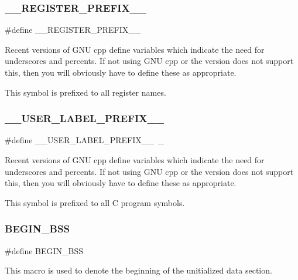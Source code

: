 \subsubsection{\texorpdfstring{\_\_REGISTER\_PREFIX\_\_}{\_\_REGISTER\_PREFIX\_\_}}
{\footnotesize\ttfamily \#define \+\_\+\+\_\+\+R\+E\+G\+I\+S\+T\+E\+R\+\_\+\+P\+R\+E\+F\+I\+X\+\_\+\+\_\+}

Recent versions of G\+NU cpp define variables which indicate the need for underscores and percents. If not using G\+NU cpp or the version does not support this, then you will obviously have to define these as appropriate.

This symbol is prefixed to all register names. \mbox{\label{group__RTEMSScoreCPUExampleASM_gaff6bf0ff0fa3b5cbd23a8ae1131c87a9}} 
\subsubsection{\texorpdfstring{\_\_USER\_LABEL\_PREFIX\_\_}{\_\_USER\_LABEL\_PREFIX\_\_}}
{\footnotesize\ttfamily \#define \+\_\+\+\_\+\+U\+S\+E\+R\+\_\+\+L\+A\+B\+E\+L\+\_\+\+P\+R\+E\+F\+I\+X\+\_\+\+\_\+~\+\_\+}

Recent versions of G\+NU cpp define variables which indicate the need for underscores and percents. If not using G\+NU cpp or the version does not support this, then you will obviously have to define these as appropriate.

This symbol is prefixed to all C program symbols. \mbox{\label{group__RTEMSScoreCPUExampleASM_ga50f110f0489e48ceda4a0473a35d2978}} 
\subsubsection{\texorpdfstring{BEGIN\_BSS}{BEGIN\_BSS}}
{\footnotesize\ttfamily \#define B\+E\+G\+I\+N\+\_\+\+B\+SS}

This macro is used to denote the beginning of the unitialized data section. \mbox{\label{group__RTEMSScoreCPUExampleASM_ga6d6dc213aff5b736968e2aff37eb2c99}} 
